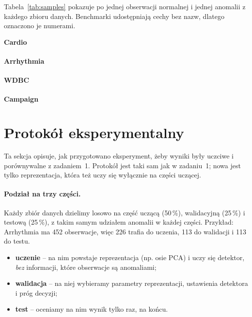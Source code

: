 \documentclass[11pt,a4paper]{article}
\begin{document}
Tabela~\ref{tab:samples} pokazuje po jednej obserwacji normalnej i jednej
anomalii z każdego zbioru danych. Benchmarki udostępniają cechy bez nazw,
dlatego oznaczono je numerami.

\begin{table}[H]
  \centering\small
  \setlength{\tabcolsep}{5pt}
  \caption{Przykładowe obserwacje (pierwsze pięć cech; ,,\dots'' -- pozostałe cechy).}
  \label{tab:samples}
  \textbf{Cardio}\\[2pt]\\[6pt]
  \textbf{Arrhythmia}\\[2pt]\\[6pt]
  \textbf{WDBC}\\[2pt]\\[6pt]
  \textbf{Campaign}\\[2pt]
\end{table}

\FloatBarrier
\section{Protokół eksperymentalny}
\label{sec:protocol}

Ta sekcja opisuje, jak przygotowano eksperyment, żeby wyniki były uczciwe
i porównywalne z zadaniem~1. Protokół jest taki sam jak w zadaniu~1; nowa
jest tylko reprezentacja, która też uczy się wyłącznie na części uczącej.

\paragraph{Podział na trzy części.} Każdy zbiór danych dzielimy losowo na
część uczącą (50\,\%), walidacyjną (25\,\%) i testową (25\,\%), z takim
samym udziałem anomalii w każdej części. Przykład: Arrhythmia ma 452
obserwacje, więc 226 trafia do uczenia, 113 do walidacji i 113 do testu.
\begin{itemize}
  \item \textbf{uczenie} -- na nim powstaje reprezentacja (np. osie PCA)
  i uczy się detektor, \emph{bez} informacji, które obserwacje są anomaliami;
  \item \textbf{walidacja} -- na niej wybieramy parametry reprezentacji,
  ustawienia detektora i próg decyzji;
  \item \textbf{test} -- oceniamy na nim wynik tylko raz, na końcu.
\end{itemize}
\end{document}
